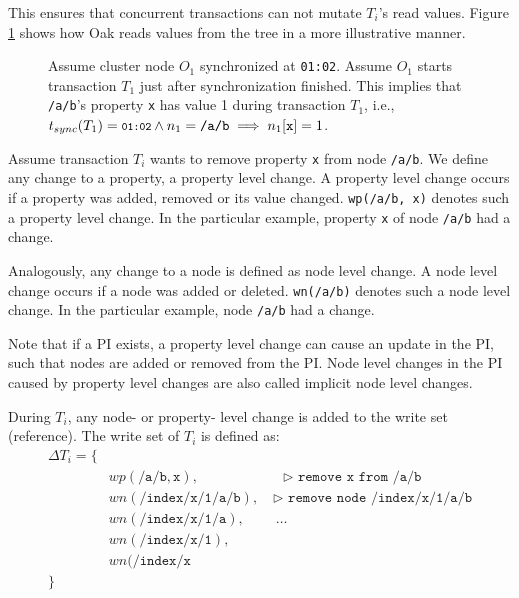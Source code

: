 \documentclass[abstracton,12pt]{scrreprt}
\newenvironment{centerverbatim}{\par\centering\varwidth{\linewidth}\verbatim}
    {\endverbatim\endvarwidth\par}
\begin{document}
This ensures that concurrent transactions can not mutate $T_i$'s read values.
Figure \ref{fig:read_example} shows how Oak reads values from the tree in a more illustrative manner.

\begin{figure}[h]
    \begin{scriptsize}
        \begin{centerverbatim}
[
    { "_id": "0:/", /* ... */ },
    { "_id": "2:/a/b", "x": {
            "r15e830cae80-0-1": 0, /* 01:00 */
            "r15e830d98e0-0-1": 1, /* 01:01 */
            "r15e830f6da0-0-2": 2, /* 01:03 */
        },
        /* ... */
    },
    /* ... */
]
        \end{centerverbatim}
    \end{scriptsize}
    \caption{
        Assume cluster node $O_1$ synchronized at \texttt{01:02}.
        Assume $O_1$ starts transaction $T_1$ just after synchronization finished.
        This implies that \texttt{/a/b}'s property \texttt{x} has value 1 during transaction $T_1$,
        i.e., $ t_{sync}(T_1) = \texttt{\footnotesize01:02} \land n_1 = \texttt{/a/b} \implies n_1[\texttt{x}] = 1$.
    }
    \label{fig:read_example}
\end{figure}

Assume transaction $T_i$ wants to remove property \texttt{x} from node \texttt{/a/b}.
We define any change to a property, a property level change.
A property level change occurs if a property was added, removed or its value changed.
\texttt{wp(/a/b, x)} denotes such a property level change.
In the particular example, property \texttt{x} of node \texttt{/a/b} had a change.

Analogously, any change to a node is defined as node level change.
A node level change occurs if a node was added or deleted.
\texttt{wn(/a/b)} denotes such a node level change.
In the particular example, node \texttt{/a/b} had a change.

Note that if a PI exists, a property level change can cause an update in the PI, such that nodes are added or removed from the PI.
Node level changes in the PI caused by property level changes are also called implicit node level changes.

During $T_i$, any node- or property- level change is added to the write set (reference).
The write set of $T_i$ is defined as:
\begin{equation}
    \begin{split}
\Delta T_i = \{\\
    & wp(\texttt{/a/b}, \texttt{x}), \qquad \qquad \qquad \texttt{$\triangleright$ remove x from /a/b}\\
    & wn(\texttt{/index/x/1/a/b}),\quad \texttt{$\triangleright$ remove node /index/x/1/a/b}\\
    & wn(\texttt{/index/x/1/a}), \qquad \ \dots\\
    & wn(\texttt{/index/x/1}),\\
    & wn(\texttt{/index/x} \\
        \}
    \end{split}
\end{equation}
\end{document}
